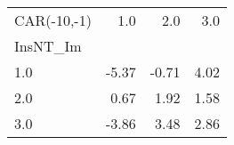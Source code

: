 \begin{tabular}{lrrr}
\toprule
CAR(-10,-1) &   1.0 &   2.0 &   3.0 \\
InsNT\_Im &       &       &       \\
\midrule
1.0      & -5.37 & -0.71 &  4.02 \\
2.0      &  0.67 &  1.92 &  1.58 \\
3.0      & -3.86 &  3.48 &  2.86 \\
\bottomrule
\end{tabular}
